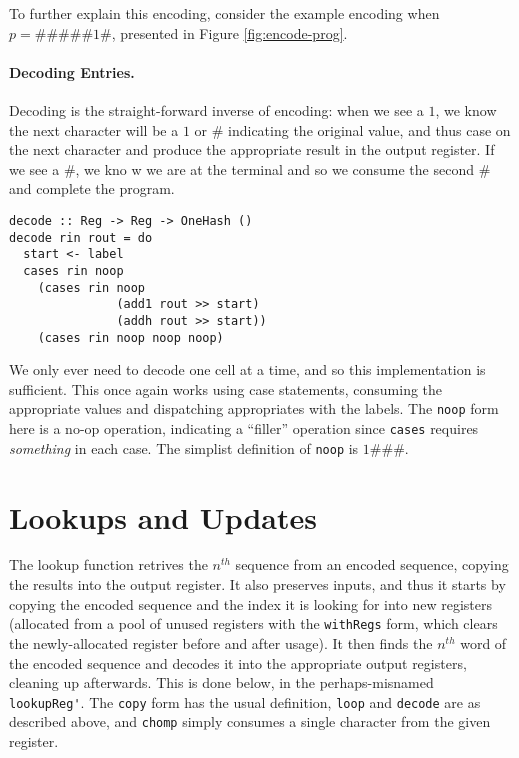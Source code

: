 \documentclass[10pt, preprint, nocopyrightspace]{sigplanconf}
\newcommand{\figref}[1]{Figure \ref{#1}}
\begin{document}
To further explain this encoding, consider the example encoding when $p =
\#\#\#\#\#1\#$, presented in \figref{fig:encode-prog}. 

\paragraph{Decoding Entries.}

Decoding is the straight-forward inverse of encoding: when we see a $1$, we know
the next character will be a $1$ or $\#$ indicating the original value, and thus
case on the next character and produce the appropriate result in the output
register. If we see a $\#$, we kno w we are at the terminal and so we consume
the second $\#$ and complete the program. 
\begin{lstlisting}
decode :: Reg -> Reg -> OneHash ()
decode rin rout = do
  start <- label
  cases rin noop
    (cases rin noop
               (add1 rout >> start)
               (addh rout >> start))
    (cases rin noop noop noop)
\end{lstlisting}
We only ever need to decode one cell at a time, and so this implementation is
sufficient. This once again works using case statements, consuming the appropriate
values and dispatching appropriates with the labels. The \lstinline{noop} form here
is a no-op operation, indicating a ``filler'' operation since \lstinline{cases}
requires \emph{something} in each case. The simplist definition of \lstinline{noop} is
$1\#\#\#$.

\section{Lookups and Updates}

The lookup function retrives the $n^{th}$ sequence from an encoded sequence,
copying the results into the output register. It also preserves inputs, and thus
it starts by copying the encoded sequence and the index it is looking for into
new registers (allocated from a pool of unused registers with the
\lstinline{withRegs} form, which clears the newly-allocated register before and
after usage). It then finds the $n^{th}$ word of the encoded sequence and
decodes it into the appropriate output registers, cleaning up afterwards. This
is done below, in the perhaps-misnamed \lstinline{lookupReg'}. The \lstinline{copy}
form has the usual definition, \lstinline{loop} and \lstinline{decode} are as described
above, and \lstinline{chomp} simply consumes a single character from the given register.
\end{document}

